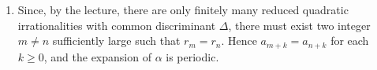 \documentclass[12pt,a4paper]{article}
\theoremstyle{plain}
\newtheorem*{Sol*}{Solution}
\theoremstyle{definition}
\newtheorem{Ex}{Exercise}
\def \Q {\mathbb Q}
\def \R {\mathbb R}
\def \Z {\mathbb Z}
\newif\ifsolutions
\newcommand{\exercise}[2]{
			\begin{Ex} #1 \end{Ex}
			\ifsolutions  \begin{Sol*} #2 \end{Sol*} \bigskip \else \bigskip  \fi
		}
\begin{document}
{\begin{enumerate}
		Recall that the denominators verify $q_{n+1} = q_n a_{n+1} + q_{n-1} > q_n + 1$, and that the fractions $p_n / q_n$ approach $\alpha$ as $n$ grows. 
		Hence $r_n' < 0$ and $| r'_n | < 1$ for some $n$ large enough.

		\item Since, by the lecture, there are only finitely many reduced quadratic irrationalities with common discriminant $\Delta$, there must exist two integer $m \neq n$ sufficiently large such that $r_m = r_n$. 
		Hence $a_{m+k} = a_{n+k}$ for each $k\geq0$, and the expansion of $\alpha$ is periodic.
	\end{enumerate}

}






\end{document}
